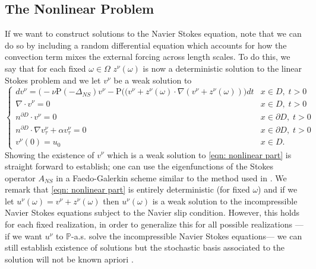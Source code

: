 \documentclass[11pt, reqno]{article}
\def\grad{\nabla}
\def\Pr{{\mathrm P}} %
\def\P{{\mathbb P}}
\begin{document}
\subsection{The Nonlinear Problem}\label{subsec: the nonlinear problem}
If we want to construct solutions to the Navier Stokes equation, note that we can do so by including a random differential equation which accounts for how the convection term mixes the external forcing across length scales. To do this, we say that for each fixed $\omega \in \Omega$ $z^\nu(\omega)$ is now a deterministic solution to the linear Stokes problem and we let $v^\nu$ be a weak solution to 
\begin{equation}\label{eqn: nonlinear part}
    \begin{cases}
        dv^\nu = \big(-\nu \Pr(-\Delta_{NS})v^\nu - \Pr((v^\nu + z^\nu(\omega) \cdot \grad (v^\nu + z^\nu(\omega))\big)dt & x \in D,\; t > 0\\
        \grad \cdot v^\nu = 0& x \in D,\; t > 0\\
        n^{\partial D} \cdot v^\nu = 0& x \in \partial D,\; t > 0\\
         n^{\partial D} \cdot \grad v_\tau^\nu + \alpha v_\tau^\nu = 0& x \in \partial D,\; t > 0\\
        v^\nu(0) = u_0 & x \in D.
    \end{cases}
\end{equation}
Showing the existence of $v^\nu$ which is a weak solution to \eqref{eqn: nonlinear part} is straight forward to establish; one can use the eigenfunctions of the Stokes operator $A_{NS}$ in a Faedo-Galerkin scheme similar to the method used in \cite{flandoli1995martingale}.
We remark that \eqref{eqn: nonlinear part} is entirely deterministic (for fixed $\omega$) and if we let $u^\nu(\omega) = v^\nu + z^\nu(\omega)$ then $u^\nu(\omega)$ is a weak solution to the incompressible Navier Stokes equations subject to the Navier slip condition. However, this holds for each fixed realization, in order to generalize this for all possible realizations --- if we want $u^\nu$ to $\P$-a.s. solve the incompressible Navier Stokes equations--- we can still establish existence of solutions but the stochastic basis associated to the solution will not be known apriori \cite{flandoli1995martingale}. 
\end{document}
